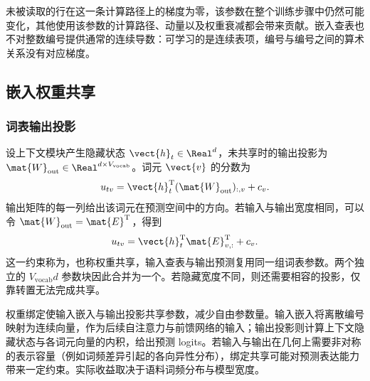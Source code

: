 \documentclass[../textbook.tex]{subfiles}
\begin{document}
未被读取的行在这一条计算路径上的梯度为零，该参数在整个训练步骤中仍然可能变化，其他使用该参数的计算路径、动量以及权重衰减都会带来贡献。嵌入查表也不对整数编号提供通常的连续导数：可学习的是连续表项，编号与编号之间的算术关系没有对应梯度。

\subsection{嵌入权重共享}

\subsubsection{词表输出投影}
设上下文模块产生隐藏状态 $\vect{h}_t\in\Real^d$，未共享时的输出投影为 $\mat{W}_{\mathrm{out}}\in\Real^{d\times V_{\mathrm{vocab}}}$。词元 $\vect{v}$ 的分数为
\begin{equation}
 u_{tv}=\vect{h}_t^{\mathrm{T}}(\mat{W}_{\mathrm{out}})_{:,v}+c_v.
\end{equation}
输出矩阵的每一列给出该词元在预测空间中的方向。若输入与输出宽度相同，可以令 $\mat{W}_{\mathrm{out}}=\mat{E}^{\mathrm{T}}$，得到
\begin{equation}
 u_{tv}=\vect{h}_t^{\mathrm{T}}\mat{E}_{v,:}^{\mathrm{T}}+c_v.
 \label{eq:repr-weight-tying}
\end{equation}
这一约束称为，也称权重共享，输入查表与输出预测复用同一组词表参数\cite{press2017outputembedding}。两个独立的 $V_{\mathrm{vocab}}d$ 参数块因此合并为一个。若隐藏宽度不同，则还需要相容的投影，仅靠转置无法完成共享。

权重绑定使输入嵌入与输出投影共享参数，减少自由参数量。输入嵌入将离散编号映射为连续向量，作为后续自注意力与前馈网络的输入；输出投影则计算上下文隐藏状态与各词元向量的内积，给出预测 logits。若输入与输出在几何上需要非对称的表示容量（例如词频差异引起的各向异性分布），绑定共享可能对预测表达能力带来一定约束\cite{press2017outputembedding}。实际收益取决于语料词频分布与模型宽度。
\end{document}
